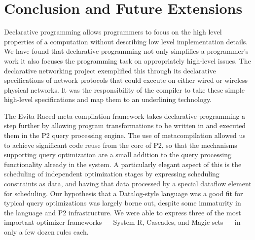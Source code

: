\chapter[Conclusion and Future Extensions]{Conclusion and Future Extensions}
\label{ch:conclusion}


Declarative programming allows programmers to focus on the high level properties of a
computation without describing low level implementation details. We have found that 
declarative programming not only simplifies a programmer's work it also focuses the
programming task on appropriately high-level issues. The declarative networking project
exemplified this through its declarative specifications of network protocols that could 
execute on either wired or wireless physical networks. It was the responsibility of the
compiler to take these simple high-level specifications and map them to an underlining
technology. 

The Evita Raced meta-compilation framework takes declarative programming a step
further by allowing \OVERLOG program transformations to be written in \OVERLOG
and executed them in the P2 query processing engine.  The use of
metacompilation allowed us to achieve significant code reuse from the core of
P2, so that the mechanisms supporting query optimization are a small addition
to the query processing functionality already in the system.  A particularly
elegant aspect of this is the scheduling of independent optimization stages by
expressing scheduling constraints as data, and having that data processed by a
special dataflow element for scheduling.  Our hypothesis that a Datalog-style
language was a good fit for typical query optimizations was largely borne out,
despite some immaturity in the \OVERLOG language and P2 infrastructure.  We
were able to express three of the most important optimizer frameworks --- System
R, Cascades, and Magic-sets --- in only a few dozen rules each.


